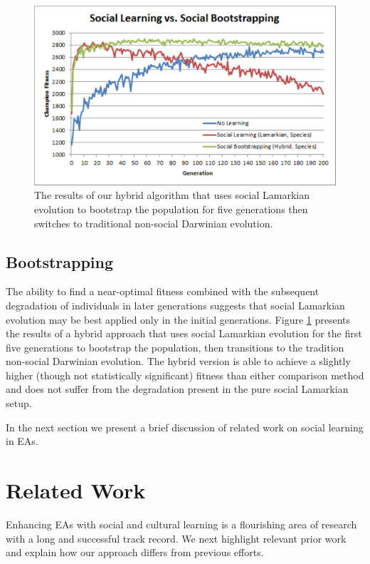 \documentclass{acm_proc_article-sp}
\begin{document}
\begin{figure}
  \centering
    \includegraphics[scale=.35]{learning_bootstrapping.pdf}
  \caption{The results of our hybrid algorithm that uses social Lamarkian evolution to bootstrap the population for five generations then switches to traditional non-social Darwinian evolution.}
  \label{fig:learning-bootstrapping}
\end{figure}

\subsection*{Bootstrapping}
The ability to find a near-optimal fitness combined with the subsequent degradation of individuals in later generations suggests that social Lamarkian evolution may be best applied only in the initial generations. Figure \ref{fig:learning-bootstrapping} presents the results of a hybrid approach that uses social Lamarkian evolution for the first five generations to bootstrap the population, then transitions to the tradition non-social Darwinian evolution. The hybrid version is able to achieve a slightly higher (though not statistically significant) fitness than either comparison method and does not suffer from the degradation present in the pure social Lamarkian setup.

In the next section we present a brief discussion of related work on social learning in EAs.

\section{Related Work}
\label{sec:related}
Enhancing EAs with social and cultural learning is a flourishing area of research with a long and successful track record.
We next highlight relevant prior work and explain how our approach differs from previous efforts.
\end{document}
